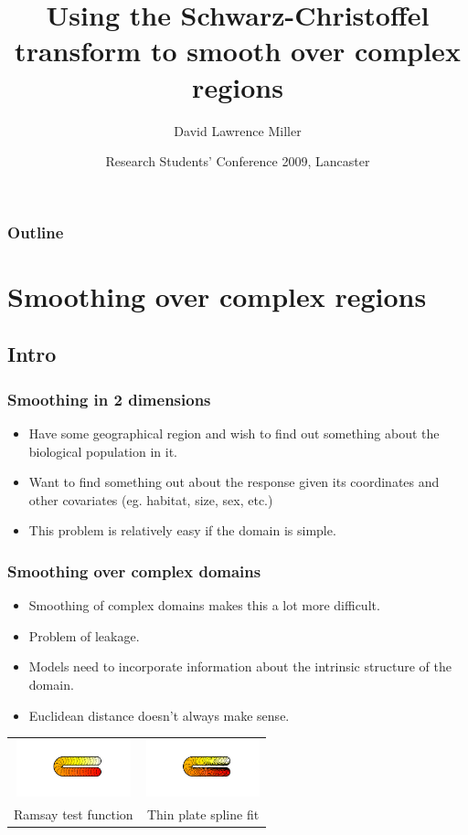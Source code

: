 \documentclass[ignorenonframetext]{beamer} %
\title[Smoothing over complex regions]{Using the Schwarz-Christoffel transform to smooth over complex regions}
\author[Miller]{David Lawrence Miller}
\institute{Mathematical Sciences\\University of Bath}
\date[24 March 2009] {Research Students' Conference 2009, Lancaster}
\newcommand{\bc}{\begin{center}}
\newcommand{\ec}{\end{center}}
\newcommand{\bi}{\begin{itemize}}
\newcommand{\ei}{\end{itemize}}
\begin{document}
\begin{frame}
  \titlepage
\end{frame}


 {
\begin{frame}
  \frametitle{Outline}
  \tableofcontents %
\end{frame}
}

\section{Smoothing over complex regions}

\subsection{Intro}

\begin{frame}
	\frametitle{Smoothing in 2 dimensions}
       \bi
         \item Have some geographical region and wish to find out something about the biological population in it. 
         \item Want to find something out about the response given its coordinates and other covariates (eg. habitat, size, sex, etc.) 
         \item This problem is relatively easy if the domain is simple.
        \ei

\end{frame}

\begin{frame}
	\frametitle{Smoothing over complex domains}
       \bi
         \item Smoothing of complex domains makes this a lot more difficult.
         \item Problem of leakage.
         \item Models need to incorporate information about the intrinsic structure of the domain.
         \item Euclidean distance doesn't always make sense.
       \ei
       \bc\begin{tabular}{@{}cc}
          \includegraphics[width=1.3in]{figs/ramsayhorseshoe} & \includegraphics[width=1.3in]{figs/leakageexample}\\
          Ramsay test function & Thin plate spline fit\\
       \end{tabular}\ec
\end{frame}
\end{document}
